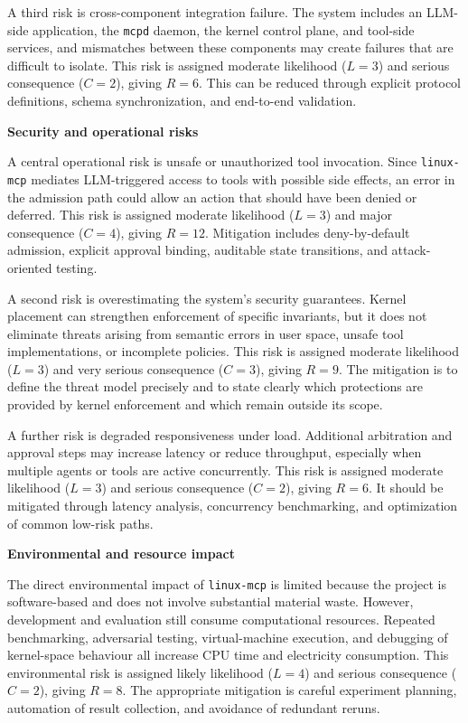 A third risk is cross-component integration failure.
The system includes an LLM-side application, the \texttt{mcpd} daemon, the kernel control plane, and tool-side services, and mismatches between these components may create failures that are difficult to isolate.
This risk is assigned moderate likelihood ($L = 3$) and serious consequence ($C = 2$), giving $R = 6$.
This can be reduced through explicit protocol definitions, schema synchronization, and end-to-end validation.

\textbf{Security and operational risks}

A central operational risk is unsafe or unauthorized tool invocation.
Since \texttt{linux-mcp} mediates LLM-triggered access to tools with possible side effects, an error in the admission path could allow an action that should have been denied or deferred.
This risk is assigned moderate likelihood ($L = 3$) and major consequence ($C = 4$), giving $R = 12$.
Mitigation includes deny-by-default admission, explicit approval binding, auditable state transitions, and attack-oriented testing.

A second risk is overestimating the system's security guarantees.
Kernel placement can strengthen enforcement of specific invariants, but it does not eliminate threats arising from semantic errors in user space, unsafe tool implementations, or incomplete policies.
This risk is assigned moderate likelihood ($L = 3$) and very serious consequence ($C = 3$), giving $R = 9$.
The mitigation is to define the threat model precisely and to state clearly which protections are provided by kernel enforcement and which remain outside its scope.

A further risk is degraded responsiveness under load.
Additional arbitration and approval steps may increase latency or reduce throughput, especially when multiple agents or tools are active concurrently.
This risk is assigned moderate likelihood ($L = 3$) and serious consequence ($C = 2$), giving $R = 6$.
It should be mitigated through latency analysis, concurrency benchmarking, and optimization of common low-risk paths.

\textbf{Environmental and resource impact}

The direct environmental impact of \texttt{linux-mcp} is limited because the project is software-based and does not involve substantial material waste.
However, development and evaluation still consume computational resources.
Repeated benchmarking, adversarial testing, virtual-machine execution, and debugging of kernel-space behaviour all increase CPU time and electricity consumption.
This environmental risk is assigned likely likelihood ($L = 4$) and serious consequence ($C = 2$), giving $R = 8$.
The appropriate mitigation is careful experiment planning, automation of result collection, and avoidance of redundant reruns.


